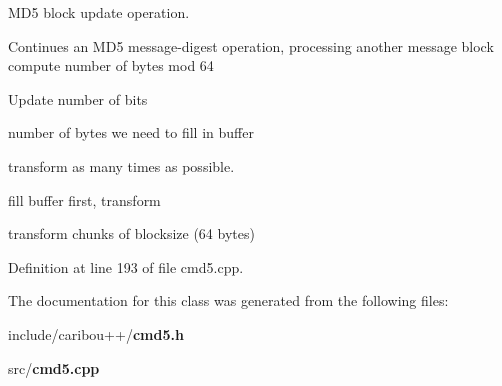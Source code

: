 M\+D5 block update operation. 

Continues an M\+D5 message-\/digest operation, processing another message block compute number of bytes mod 64

Update number of bits

number of bytes we need to fill in buffer

transform as many times as possible.

fill buffer first, transform

transform chunks of blocksize (64 bytes) 

Definition at line 193 of file cmd5.\+cpp.



The documentation for this class was generated from the following files\+:\begin{DoxyCompactItemize}
\item 
include/caribou++/{\bf cmd5.\+h}\item 
src/{\bf cmd5.\+cpp}\end{DoxyCompactItemize}
